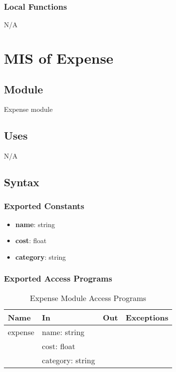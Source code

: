 \documentclass[12pt, titlepage]{article}
\begin{document}
\subsubsection{Local Functions}
N/A

\newpage


\section{MIS of Expense}\label{expense_module}

\subsection{Module}

Expense module

\subsection{Uses}
N/A

\subsection{Syntax}

\subsubsection{Exported Constants}
\begin{itemize}
  \item \textbf{name}: string
  \item \textbf{cost}: float
  \item \textbf{category}: string
\end{itemize}

\subsubsection{Exported Access Programs}

\begin{center}
  \begin{table}[H]
    \caption{Expense Module Access Programs}
\begin{tabular}{p{4cm} p{4cm} p{4cm} p{4cm}}
\hline
\textbf{Name} & \textbf{In} & \textbf{Out} & \textbf{Exceptions} \\
\hline
expense & name: string &  &  \\
  & cost: float &  &  \\
  & category: string &  &  \\
\hline
\end{tabular}
\end{table}
\end{center}
\end{document}
